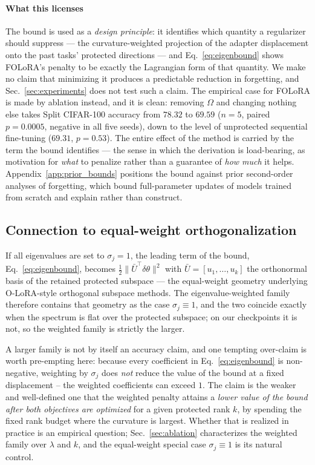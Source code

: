 \paragraph{What this licenses}
The bound is used as a \emph{design principle}: it identifies which quantity a regularizer
should suppress --- the curvature-weighted projection of the adapter displacement onto the
past tasks' protected directions --- and Eq.~\eqref{eq:eigenbound} shows FOLoRA's penalty to
be exactly the Lagrangian form of that quantity. We make no claim that minimizing it
produces a predictable reduction in forgetting, and Sec.~\ref{sec:experiments} does not test
such a claim. The empirical case for FOLoRA is made by ablation instead, and it is clean:
removing $\Omega$ and changing nothing else takes Split CIFAR-100 accuracy from $78.32$ to
$69.59$ ($n{=}5$, paired $p=0.0005$, negative in all five seeds), down to the level of
unprotected sequential fine-tuning ($69.31$, $p=0.53$). The entire effect of the method is
carried by the term the bound identifies --- the sense in which the derivation is
load-bearing, as motivation for \emph{what} to penalize rather than a guarantee of \emph{how
much} it helps. Appendix~\ref{app:prior_bounds} positions the bound against prior
second-order analyses of forgetting, which bound full-parameter updates of models trained
from scratch and explain rather than construct.

\subsection{Connection to equal-weight orthogonalization}
\label{sec:equalweight}

If all eigenvalues are set to $\sigma_j=1$, the leading term of the bound,
Eq.~\eqref{eq:eigenbound}, becomes $\frac12\|\bar{U}^{\!\top}\delta\theta\|^2$ with
$\bar{U}=[u_1,\dots,u_k]$ the orthonormal basis of the retained protected subspace --- the
equal-weight geometry underlying O-LoRA-style orthogonal subspace methods. The
eigenvalue-weighted family therefore contains that geometry as the case $\sigma_j\equiv1$,
and the two coincide exactly when the spectrum is flat over the protected subspace; on our
checkpoints it is not, so the weighted family is strictly the larger.

A larger family is not by itself an accuracy claim, and one tempting over-claim is worth
pre-empting here: because every coefficient in Eq.~\eqref{eq:eigenbound} is non-negative,
weighting by $\sigma_j$ does \emph{not} reduce the value of the bound at a fixed
displacement -- the weighted coefficients can exceed $1$. The claim is the weaker and
well-defined one that the weighted penalty attains a \emph{lower value of the bound after
both objectives are optimized} for a given protected rank $k$, by spending the fixed rank
budget where the curvature is largest. Whether that is realized in practice is an
empirical question; Sec.~\ref{sec:ablation} characterizes the weighted family over
$\lambda$ and $k$, and the equal-weight special case $\sigma_j\equiv1$ is its natural
control.
